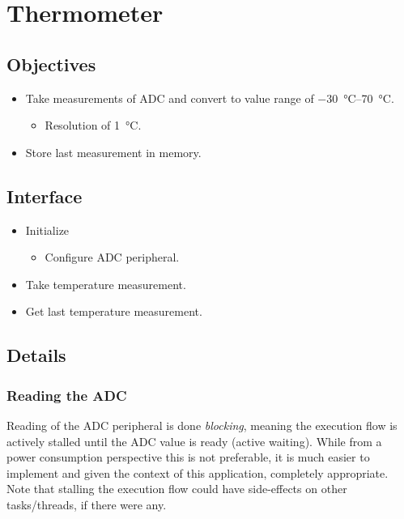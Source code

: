 \chapter{Thermometer}

\section{Objectives}

\begin{itemize}
    \item Take measurements of ADC and convert to value range of \SIrange[range-units=single]{-30}{+70}{\degreeCelsius}.
          \begin{itemize}
              \item Resolution of \SI{1}{\degreeCelsius}.
          \end{itemize}
    \item Store last measurement in memory.
\end{itemize}

\section{Interface}

\begin{itemize}
    \item Initialize
          \begin{itemize}
              \item Configure ADC peripheral.
          \end{itemize}
    \item Take temperature measurement.
    \item Get last temperature measurement.
\end{itemize}

\section{Details}

\subsection{Reading the ADC}

Reading of the ADC peripheral is done \emph{blocking}, meaning the execution flow is actively stalled until the ADC value is ready (active waiting). While from a power consumption perspective this is not preferable, it is much easier to implement and given the context of this application, completely appropriate. Note that stalling the execution flow could have side-effects on other tasks/threads, if there were any.

